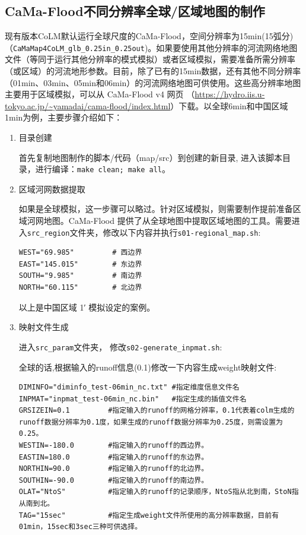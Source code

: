 \documentclass[a4paper,12pt,twoside]{article}
\begin{document}
\subsection{CaMa-Flood不同分辨率全球/区域地图的制作}
现有版本CoLM默认运行全球尺度的CaMa-Flood，空间分辨率为15min(15弧分)（\texttt{CaMaMap4CoLM\_glb\_0.25in\_0.25out})。如果要使用其他分辨率的河流网络地图文件（等同于运行其他分辨率的模式模拟）或者区域模拟，需要准备所需分辨率（或区域）的河流地形参数。目前，除了已有的15min数据，还有其他不同分辨率（01min、03min、05min和06min）的河流网络地图可供使用。这些高分辨率地图主要用于区域模拟，可以从 CaMa-Flood v4 网页 （\url{https://hydro.iis.u-tokyo.ac.jp/~yamadai/cama-flood/index.html}）下载。以全球6min和中国区域1min为例，主要步骤介绍如下：

\begin{enumerate}
\item 目录创建

首先复制地图制作的脚本/代码（map/src）到创建的新目录, 进入该脚本目录，进行编译：\verb|make clean; make all|。

\item 区域河网数据提取

如果是全球模拟，这一步骤可以略过。针对区域模拟，则需要制作提前准备区域河网地图。CaMa-Flood 提供了从全球地图中提取区域地图的工具。需要进入\texttt{src\_region}文件夹，修改以下内容并执行\texttt{s01-regional\_map.sh}:
\begin{lstlisting}
WEST="69.985"         # 西边界
EAST="145.015"        # 东边界
SOUTH="9.985"         # 南边界
NORTH="60.115"        # 北边界
\end{lstlisting}
以上是中国区域 \ang{;1;} 模拟设定的案例。

\item 映射文件生成

进入\texttt{src\_param}文件夹， 修改\texttt{s02-generate\_inpmat.sh}:

全球的话,根据输入的runoff信息(0.1\textdegree)修改一下内容生成weight映射文件:
\begin{lstlisting}
DIMINFO="diminfo_test-06min_nc.txt" #指定维度信息文件名
INPMAT="inpmat_test-06min_nc.bin"   #指定生成的插值文件名
GRSIZEIN=0.1         #指定输入的runoff的网格分辨率，0.1代表着colm生成的runoff数据分辨率为0.1度，如果生成的runoff数据分辨率为0.25度，则需设置为0.25。
WESTIN=-180.0        #指定输入的runoff的西边界。
EASTIN=180.0         #指定输入的runoff的东边界。
NORTHIN=90.0         #指定输入的runoff的北边界。
SOUTHIN=-90.0        #指定输入的runoff的南边界。
OLAT="NtoS"          #指定输入的runoff的记录顺序，NtoS指从北到南，StoN指从南到北。
TAG="15sec"          #指定生成weight文件所使用的高分辨率数据，目前有01min，15sec和3sec三种可供选择。
\end{lstlisting}


\end{enumerate}
\end{document}
